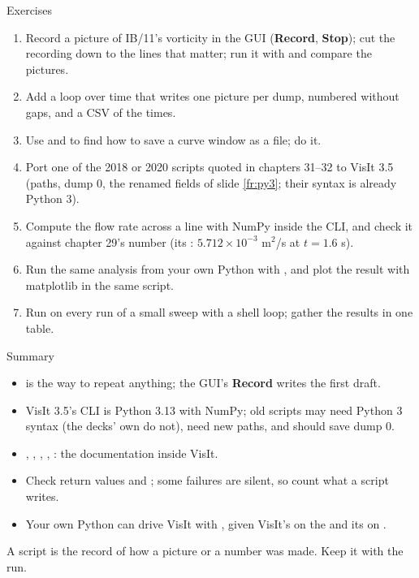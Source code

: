 \documentclass[aspectratio=169,11pt]{beamer}
\newcommand{\gui}[1]{\textsf{\textbf{#1}}}
\begin{document}
\begin{frame}{Exercises}
\label{fr:exercises}
\footnotesize
\begin{enumerate}\setlength{\itemsep}{1pt}
  \item Record a picture of IB/11's vorticity in the GUI (\gui{Record}, \gui{Stop}); cut the recording down to the lines that matter; run it with  and compare the pictures.
  \item Add a loop over time that writes one picture per dump, numbered without gaps, and a CSV of the times.
  \item Use  and  to find how to save a curve window as a  file; do it.
  \item Port one of the 2018 or 2020 scripts quoted in chapters 31--32 to VisIt 3.5 (paths, dump 0, the renamed fields of slide \ref{fr:py3}; their syntax is already Python 3).
  \item Compute the flow rate across a line with NumPy inside the CLI, and check it against chapter 29's number (its : $5.712\times10^{-3}$ m$^2$/s at $t = 1.6$ s).
  \item Run the same analysis from your own Python with , and plot the result with matplotlib in the same script.
  \item Run  on every run of a small sweep with a shell loop; gather the results in one table.
\end{enumerate}
\end{frame}

\begin{frame}{Summary}
\label{fr:summary}
\footnotesize
\begin{itemize}\setlength{\itemsep}{1pt}
  \item {} is the way to repeat anything; the GUI's \gui{Record} writes the first draft.
  \item VisIt 3.5's CLI is Python 3.13 with NumPy; old scripts may need Python 3 syntax (the decks' own do not), need new paths, and should save dump 0.
  \item {}, , , , : the documentation inside VisIt.
  \item Check return values and ; some failures are silent, so count what a script writes.
  \item Your own Python can drive VisIt with , given VisIt's  on the  and its  on .
\end{itemize}
\begin{punchbox}
\small A script is the record of how a picture or a number was made. Keep it with the run.
\end{punchbox}
\end{frame}
\end{document}
